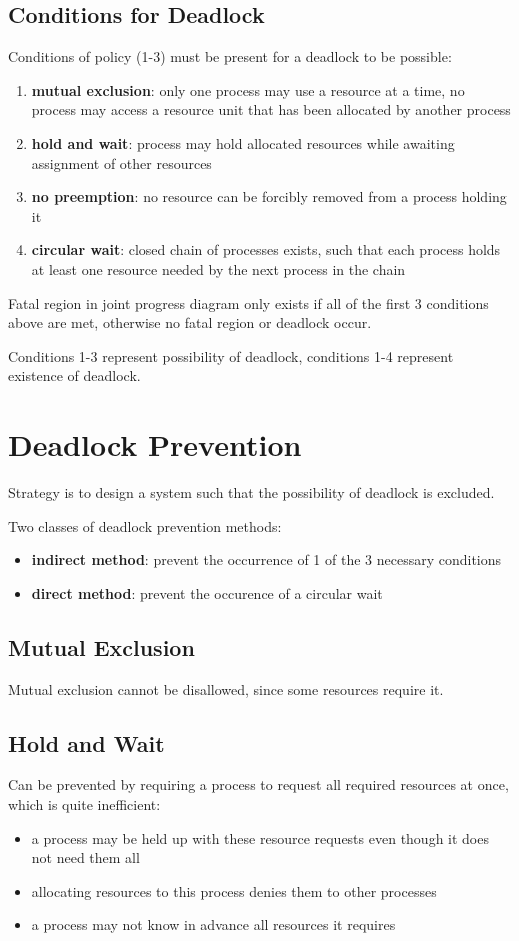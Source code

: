 \documentclass[11pt]{article}
\begin{document}
\subsection{Conditions for Deadlock}
\label{sec:orgf9d7cf9}
Conditions of policy (1-3) must be present for a deadlock to be possible:
\begin{enumerate}
\item \textbf{mutual exclusion}: only one process may use a resource at a time, no process
may access a resource unit that has been allocated by another process
\item \textbf{hold and wait}: process may hold allocated resources while awaiting assignment
of other resources
\item \textbf{no preemption}: no resource can be forcibly removed from a process holding it
\item \textbf{circular wait}: closed chain of processes exists, such that each process
holds at least one resource needed by the next process in the chain
\end{enumerate}

Fatal region in joint progress diagram only exists if all of the first 3 conditions
above are met, otherwise no fatal region or deadlock occur.

Conditions 1-3 represent possibility of deadlock,
conditions 1-4 represent existence of deadlock.
\section{Deadlock Prevention}
\label{sec:org50665ff}
Strategy is to design a system such that the possibility of deadlock is excluded.

Two classes of deadlock prevention methods:
\begin{itemize}
\item \textbf{indirect method}: prevent the occurrence of 1 of the 3 necessary conditions
\item \textbf{direct method}: prevent the occurence of a circular wait
\end{itemize}
\subsection{Mutual Exclusion}
\label{sec:org46cc635}
Mutual exclusion cannot be disallowed, since some resources require it.
\subsection{Hold and Wait}
\label{sec:orgd9f0300}
Can be prevented by requiring a process to request all required resources at once,
which is quite inefficient:
\begin{itemize}
\item a process may be held up with these resource requests even though it does not
need them all
\item allocating resources to this process denies them to other processes
\item a process may not know in advance all resources it requires
\end{itemize}
\end{document}
